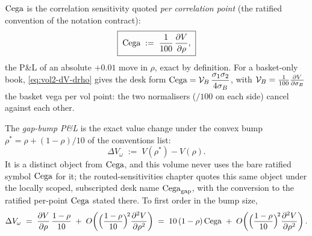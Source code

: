 \begin{definition}[$\Cega$]
\label{def:vol2-cega}
$\Cega$ is the correlation sensitivity quoted \emph{per correlation point}
(the ratified convention of the notation contract):
\begin{equation}
\boxed{\;
\mathrm{Cega} \;:=\; \frac{1}{100}\,\frac{\partial V}{\partial \rho},
\;}
\label{eq:vol2-cega}
\end{equation}
the P\&L of an absolute $+0.01$ move in $\rho$, exact by definition. For a
basket-only book, \eqref{eq:vol2-dV-drho} gives the desk form
$\mathrm{Cega} = \mathcal{V}_B\,\dfrac{\sigma_1\sigma_2}{4\sigma_B}$, with
$\mathcal{V}_B = \tfrac1{100}\frac{\partial V}{\partial \sigma_B}$ the basket vega per vol point: the two
normalisers ($/100$ on each side) cancel against each other.
\end{definition}

\begin{definition}
\label{def:vol2-gapbump}
The \emph{gap-bump P\&L} is the exact value change under the convex bump
$\rho^{*} = \rho + (1-\rho)/10$ of the conventions list:
\begin{equation}
\Delta V_{\omega} \;:=\; V(\rho^{*}) - V(\rho).
\label{eq:vol2-gapbump}
\end{equation}
It is a distinct object from $\Cega$, and this volume never uses the bare
ratified symbol $\Cega$ for it; the routed-sensitivities chapter quotes
this same object under the locally scoped, subscripted desk name
$\mathrm{Cega}_{\mathrm{gap}}$, with the conversion to the ratified per-point
$\Cega$ stated there. To first order in the bump size,
\begin{equation}
\Delta V_{\omega}
 \;=\; \frac{\partial V}{\partial \rho}\,\frac{1-\rho}{10}
 \;+\; O\!\left(\Bigl(\frac{1-\rho}{10}\Bigr)^{\!2}\frac{\partial^2 V}{\partial \rho^2}\right)
 \;=\; 10\,(1-\rho)\,\mathrm{Cega}
 \;+\; O\!\left(\Bigl(\frac{1-\rho}{10}\Bigr)^{\!2}\frac{\partial^2 V}{\partial \rho^2}\right).
\label{eq:vol2-gapbump-linear}
\end{equation}
\end{definition}

